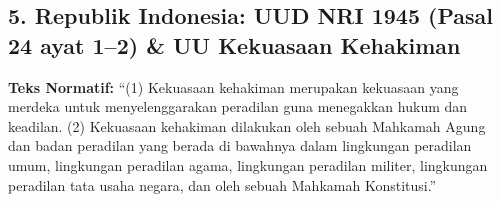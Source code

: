 \documentclass[12pt, a4paper]{article}
\begin{document}
\subsection*{5. Republik Indonesia: UUD NRI 1945 (Pasal 24 ayat 1--2) \& UU Kekuasaan Kehakiman}
\noindent\textbf{Teks Normatif:}
``(1) Kekuasaan kehakiman merupakan kekuasaan yang merdeka untuk menyelenggarakan peradilan guna menegakkan hukum dan keadilan. (2) Kekuasaan kehakiman dilakukan oleh sebuah Mahkamah Agung dan badan peradilan yang berada di bawahnya dalam lingkungan peradilan umum, lingkungan peradilan agama, lingkungan peradilan militer, lingkungan peradilan tata usaha negara, dan oleh sebuah Mahkamah Konstitusi.''
\end{document}

